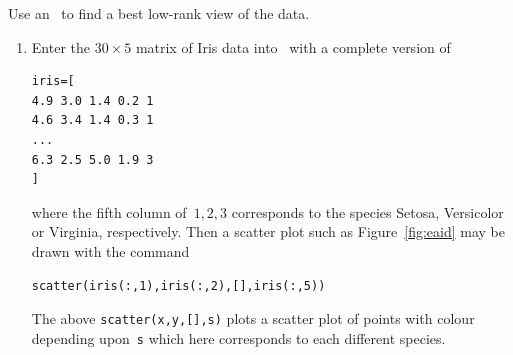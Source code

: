 \begin{example}
\begin{solution} 
Use an \svd\ to find a best low-rank view of the data.
\begin{enumerate}
\item Enter the \(30\times5\) matrix of Iris data into \script\  with a complete version of
\begin{verbatim}
iris=[
4.9 3.0 1.4 0.2 1
4.6 3.4 1.4 0.3 1
...
6.3 2.5 5.0 1.9 3
]
\end{verbatim}
where the fifth column of~\(1,2,3\) corresponds to the species Setosa, Versicolor or Virginia, respectively.
\setbox\ajrqrbox\hbox{}%
\marginpar{\usebox{\ajrqrbox\\[2ex]}}%
Then a scatter plot such as Figure~\ref{fig:eaid} may be drawn with the command
\begin{verbatim}
scatter(iris(:,1),iris(:,2),[],iris(:,5))
\end{verbatim}
The above \verb|scatter(x,y,[],s)|  plots a scatter plot of points with colour depending upon~\verb|s| which here corresponds to each different species.


\end{enumerate}
\end{solution}
\end{example}
